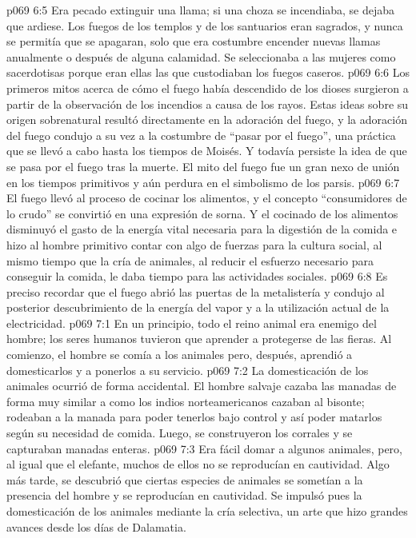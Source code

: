\vs p069 6:5 Era pecado extinguir una llama; si una choza se incendiaba, se dejaba que ardiese. Los fuegos de los templos y de los santuarios eran sagrados, y nunca se permitía que se apagaran, solo que era costumbre encender nuevas llamas anualmente o después de alguna calamidad. Se seleccionaba a las mujeres como sacerdotisas porque eran ellas las que custodiaban los fuegos caseros.
\vs p069 6:6 Los primeros mitos acerca de cómo el fuego había descendido de los dioses surgieron a partir de la observación de los incendios a causa de los rayos. Estas ideas sobre su origen sobrenatural resultó directamente en la adoración del fuego, y la adoración del fuego condujo a su vez a la costumbre de “pasar por el fuego”, una práctica que se llevó a cabo hasta los tiempos de Moisés. Y todavía persiste la idea de que se pasa por el fuego tras la muerte. El mito del fuego fue un gran nexo de unión en los tiempos primitivos y aún perdura en el simbolismo de los parsis.
\vs p069 6:7 \pc El fuego llevó al proceso de cocinar los alimentos, y el concepto “consumidores de lo crudo” se convirtió en una expresión de sorna. Y el cocinado de los alimentos disminuyó el gasto de la energía vital necesaria para la digestión de la comida e hizo al hombre primitivo contar con algo de fuerzas para la cultura social, al mismo tiempo que la cría de animales, al reducir el esfuerzo necesario para conseguir la comida, le daba tiempo para las actividades sociales.
\vs p069 6:8 Es preciso recordar que el fuego abrió las puertas de la metalistería y condujo al posterior descubrimiento de la energía del vapor y a la utilización actual de la electricidad.
\vs p069 7:1 En un principio, todo el reino animal era enemigo del hombre; los seres humanos tuvieron que aprender a protegerse de las fieras. Al comienzo, el hombre se comía a los animales pero, después, aprendió a domesticarlos y a ponerlos a su servicio.
\vs p069 7:2 La domesticación de los animales ocurrió de forma accidental. El hombre salvaje cazaba las manadas de forma muy similar a como los indios norteamericanos cazaban al bisonte; rodeaban a la manada para poder tenerlos bajo control y así poder matarlos según su necesidad de comida. Luego, se construyeron los corrales y se capturaban manadas enteras.
\vs p069 7:3 Era fácil domar a algunos animales, pero, al igual que el elefante, muchos de ellos no se reproducían en cautividad. Algo más tarde, se descubrió que ciertas especies de animales se sometían a la presencia del hombre y se reproducían en cautividad. Se impulsó pues la domesticación de los animales mediante la cría selectiva, un arte que hizo grandes avances desde los días de Dalamatia.
